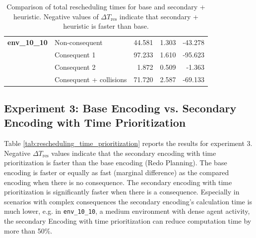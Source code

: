 \documentclass[runningheads]{llncs}
\begin{document}
\begin{table}[htbp]
\begin{tabular}{@{}llrrr@{}}
		\midrule
		
		\textbf{env\_10\_10}
		& Non-consequent & 44.581 & 1.303 & -43.278 \\
		& Consequent 1 & 97.233 & 1.610 & -95.623 \\
		& Consequent 2 & 1.872 & 0.509 & -1.363 \\
		& Consequent + collisions & 71.720 & 2.587 & -69.133 \\
		
		\bottomrule
	\end{tabular}
	\vspace{4mm}
	\caption{Comparison of total rescheduling times for base and secondary + heuristic. Negative values of $\Delta T_{\mathrm{res}}$ indicate that secondary + heuristic is faster than base.}
	\label{tab:rescheduling_times_base}
\end{table}

\subsection{Experiment 3: Base Encoding vs. Secondary Encoding with Time Prioritization}

Table \ref{tab:rescheduling_time_prioritization} reports the results for experiment 3. Negative $\Delta T_{\mathrm{res}}$ values indicate that the secondary encoding with time prioritization is faster than the base encoding (Redo Planning). 
The base encoding is faster or equally as fast (marginal difference) as the compared encoding when there is no consequence.
The secondary encoding with time prioritization is significantly faster when there is a consequence. Especially in scenarios with complex consequences the secondary encoding's calculation time is much lower, e.g. in \texttt{env\_10\_10}, a medium environment with dense agent activity, the secondary Encoding with time prioritization can reduce computation time by more than 50\%.
\end{document}

